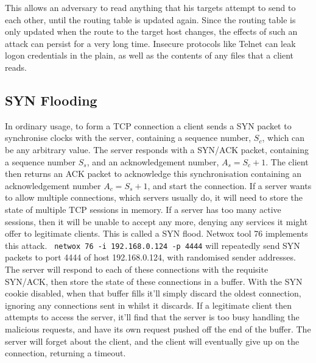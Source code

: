 This allows an adversary to read anything that his targets attempt to send to each other, until the routing table is
updated again. Since the routing table is only updated when the route to the target host changes, the effects of such an
attack can persist for a very long time. Insecure protocols like Telnet can leak logon credentials in the plain, as well
as the contents of any files that a client reads.

\subsection{SYN Flooding}

In ordinary usage, to form a TCP connection a client sends a SYN packet to synchronise clocks with the server,
containing a sequence number, $S_c$, which can be any arbitrary value. The server responds with a SYN/ACK packet,
containing a sequence number $S_s$, and an acknowledgement number, $A_s = S_c+1$. The client then returns an ACK packet
to acknowledge this synchronisation containing an acknowledgement number $A_c = S_s+1$, and start the connection. If a
server wants to allow multiple connections, which servers usually do, it will need to store the state of multiple TCP
sessions in memory. If a server has too many active sessions, then it will be unable to accept any more, denying any
services it might offer to legitimate clients. This is called a SYN flood. Netwox tool 76 implements this attack. {\tt
netwox 76 -i 192.168.0.124 -p 4444} will repeatedly send SYN packets to port 4444 of host 192.168.0.124, with randomised
sender addresses. The server will respond to each of these connections with the requisite SYN/ACK, then store the state
of these connections in a buffer. With the SYN cookie disabled, when that buffer fills it'll simply discard the oldest
connection, ignoring any connections sent in whilst it discards. If a legitimate client then attempts to access the
server, it'll find that the server is too busy handling the malicious requests, and have its own request pushed off the
end of the buffer. The server will forget about the client, and the client will eventually give up on the connection,
returning a timeout.

